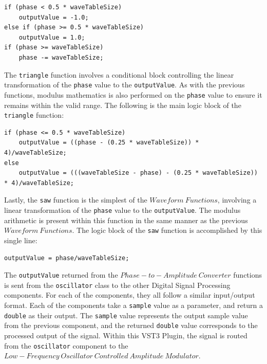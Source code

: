 \documentclass[a4paper,12pt]{report}
\begin{document}
 \noindent\begin{minipage}{\linewidth} \begin{lstlisting}[caption={square()},label={code:square},captionpos=b]
if (phase < 0.5 * waveTableSize)
    outputValue = -1.0;
else if (phase >= 0.5 * waveTableSize)
    outputValue = 1.0;
if (phase >= waveTableSize)
    phase -= waveTableSize;
\end{lstlisting} \end{minipage}

The \texttt{triangle} function involves a conditional block controlling the linear transformation of the \texttt{phase} value to the \texttt{outputValue}.  As with the previous functions, modulus mathematics is also performed on the \texttt{phase} value to ensure it remains within the valid range. The following is the main logic block of the \texttt{triangle} function:

 \noindent\begin{minipage}{\linewidth} \begin{lstlisting}[caption={triangle()},label={code:triangle},captionpos=b]
if (phase <= 0.5 * waveTableSize)
    outputValue = ((phase - (0.25 * waveTableSize)) * 4)/waveTableSize;
else
    outputValue = (((waveTableSize - phase) - (0.25 * waveTableSize)) * 4)/waveTableSize;
\end{lstlisting} \end{minipage}

Lastly, the \texttt{saw} function is the simplest of the $Waveform\ Functions$, involving a linear transformation of the \texttt{phase} value to the \texttt{outputValue}. The modulus arithmetic is present within this function in the same manner as the previous $Waveform\ Functions$. The logic block of the \texttt{saw} function is accomplished by this single line:

 \noindent\begin{minipage}{\linewidth} \begin{lstlisting}[caption={saw()},label={code:saw},captionpos=b]
outputValue = phase/waveTableSize;
\end{lstlisting} \end{minipage}

The \texttt{outputValue} returned from the $Phase-to-Amplitude\ Converter$ functions is sent from the \texttt{oscillator} class to the other Digital Signal Processing components. For each of the components, they all follow a similar input/output format. Each of the components take a \texttt{sample} value as a parameter, and return a \texttt{double} as their output. The \texttt{sample} value represents the output sample value from the previous component, and the returned \texttt{double} value corresponds to the processed output of the signal. Within this VST3 Plugin, the signal is routed from the \texttt{oscillator} component to the $Low-Frequency\ Oscillator\ Controlled\ Amplitude\ Modulator$.
\end{document}
